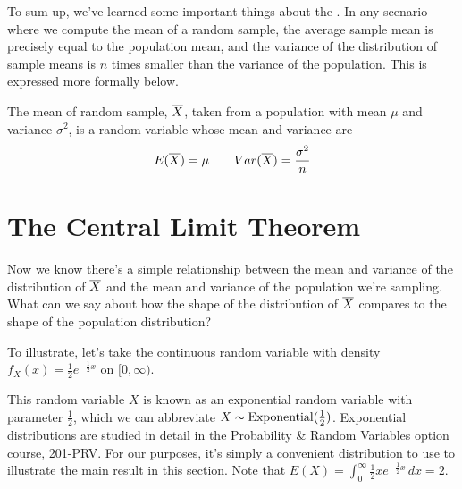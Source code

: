 To sum up, we've learned some important things about the . In any scenario where we compute the mean of a random sample, the average sample mean is precisely equal to the population mean, and the variance of the distribution of sample means is $n$ times smaller than the variance of the population. This is expressed more formally below.

\begin{keypoint}The mean of random sample, ${\overline{X}}$, taken from a population with mean $\mu$ and variance $\sigma^2$, is a random variable whose mean and variance are
$$E({\overline{X}}) = \mu \qquad  Var({\overline{X}}) = \frac{\sigma^2}{n}$$
\end{keypoint}




\section{The Central Limit Theorem}

Now we know there's a simple relationship between the mean and variance of the distribution of ${\overline{X}}$ and the mean and variance of the population we're sampling. What can we say about how the shape of the distribution of ${\overline{X}}$ compares to the shape of the population distribution?

To illustrate, let's take the continuous random variable with density $f_X(x) = \frac{1}{2}e^{-\frac{1}{2}x}$ on $[0,\infty)$.

\begin{remark}
This random variable $X$ is known as an exponential random variable with parameter $\frac{1}{2}$, which we can abbreviate $X \sim \operatorname{Exponential}(\frac{1}{2})$. Exponential distributions are studied in detail in the Probability \& Random Variables option course, 201-PRV. For our purposes, it's simply a convenient distribution to use to illustrate the main result in this section. Note that $E(X) = \int_{0}^{\infty}\frac{1}{2}xe^{-\frac{1}{2}x}\,dx = 2$.
\end{remark}

